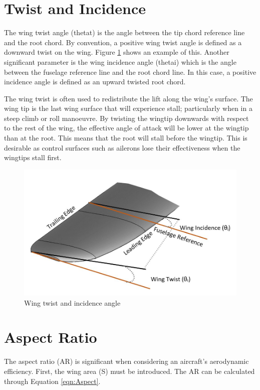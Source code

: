 \section{Twist and Incidence}
The wing twist angle (\acrshort{thetat}) is the angle between the tip chord reference line and the root chord. By convention, a positive wing twist angle is defined as a downward twist on the wing. Figure \ref{fig:twist} shows an example of this. Another significant parameter is the wing incidence angle (\acrshort{thetai}) which is the angle between the fuselage reference line and the root chord line. In this case, a positive incidence angle is defined as an upward twisted root chord. 

The wing twist is often used to redistribute the lift along the wing's surface. The wing tip is the last wing surface that will experience stall; particularly when in a steep climb or roll manoeuvre. By twisting the wingtip downwards with respect to the rest of the wing, the effective angle of attack will be lower at the wingtip than at the root. This means that the root will stall before the wingtip. This is desirable as control surfaces such as ailerons lose their effectiveness when the wingtips stall first. 


\begin{figure}[H]
  \centering
  \includegraphics[width=0.8\linewidth]{02_Background/Figs/wingo.JPG}
  \caption{Wing twist and incidence angle}
  \label{fig:twist}
\end{figure}

\section{Aspect Ratio}
The aspect ratio (\acrshort{AR}) is significant when considering an aircraft's aerodynamic efficiency. First, the wing area (\acrshort{S}) must be introduced. The \acrshort{AR} can be calculated through Equation \ref{eqn:Aspect}.

